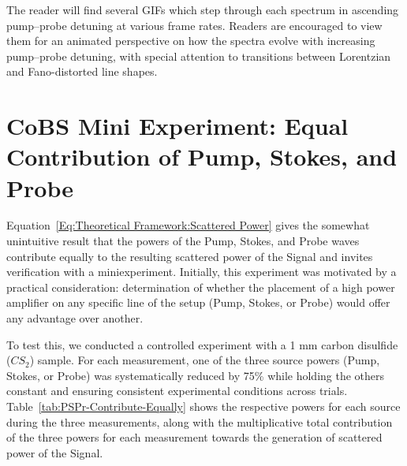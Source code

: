 \hfill

The reader will find several GIFs which step through each spectrum in ascending pump--probe detuning at various frame rates. Readers are encouraged to view them for an animated perspective on how the spectra evolve with increasing pump--probe detuning, with special attention to transitions between Lorentzian and Fano-distorted line shapes.

\newpage


\section{CoBS Mini Experiment: Equal Contribution of Pump, Stokes, and Probe}

Equation~\ref{Eq:Theoretical Framework:Scattered Power} gives the somewhat unintuitive result that the powers of the Pump, Stokes, and Probe waves contribute equally to the resulting scattered power of the Signal and invites verification with a miniexperiment. Initially, this experiment was motivated by a practical consideration: determination of whether the placement of a high power amplifier on any specific line of the setup (Pump, Stokes, or Probe) would offer any advantage over another.

To test this, we conducted a controlled experiment with a 1 mm carbon disulfide ($CS_{2}$) sample. For each measurement, one of the three source powers (Pump, Stokes, or Probe) was systematically reduced by 75\% while holding the others constant and ensuring consistent experimental conditions across trials. Table~\ref{tab:PSPr-Contribute-Equally} shows the respective powers for each source during the three measurements, along with the multiplicative total contribution of the three powers for each measurement towards the generation of scattered power of the Signal.

